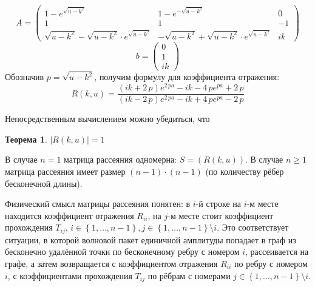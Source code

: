 \documentclass[a4 paper, 12 pt]{extarticle}
\newtheorem{theorem}{Теорема}[section]
\begin{document}
   \[ A = \left(\begin{smallmatrix}
   1-e^{\sqrt{u-k^2}} & 1-e^{-\sqrt{u-k^2}} & 0 \\
   1 & 1 & -1 \\
   \sqrt{u-k^2}-\sqrt{u-k^2} \cdot e^{\sqrt{u-k^2}} & -\sqrt{u-k^2}+\sqrt{u-k^2} \cdot e^{\sqrt{u-k^2}} & ik
   \end{smallmatrix}\right)\]
   \[b = \left(\begin{smallmatrix}
   0 \\
   1 \\
   ik
   \end{smallmatrix}\right)
   \]
   Обозначив $p=\sqrt{u-k^2}$, получим формулу для коэффициента отражения:
   \begin{equation}
   \label{OneDimensionalReflection}
   R\left(k,u\right) = {\frac { \left( ik+2\,p \right) {e}^{2\,pa}-ik-4\,p{e}^{pa}+2\,p}{ \left( ik-2\,p \right) {e}^{2\,pa}-ik+4\,p{e}^{pa}-2\,p}}
   \end{equation}
     
   Непосредственным вычислением можно убедиться, что 
   \begin{theorem}
   	$\left|R\left(k,u\right)\right| = 1$
   \end{theorem}
   
   В случае $n=1$ матрица рассеяния одномерна: $S = \left(R\left(k,u\right)\right)$. 
   В случае $n \geqslant 1$ матрица рассеяния имеет размер $(n-1) \cdot (n-1)$ (по количеству рёбер бесконечной длины).
   
   Физический смысл матрицы рассеяния понятен: в $i$-й строке на $i$-м месте находится коэффициент отражения $R_{ii}$, на $j$-м месте стоит коэффициент прохождения $T_{ij}$, $i \in \left\{1,\ldots,n-1\right\}, j \in \left\{1,\ldots,n-1\right\}\setminus i $.  Это соответствует ситуации, в которой волновой пакет единичной амплитуды попадает в граф из бесконечно удалённой точки по бесконечному ребру с номером $i$, рассеивается на графе, а затем возвращается с коэффициентом отражения $R_{ii}$ по ребру с номером $i$, с коэффициентами прохождения $T_{ij}$ по рёбрам с номерами $j \in \left\{1,\ldots,n-1\right\}\setminus i $.
   
\end{document}

